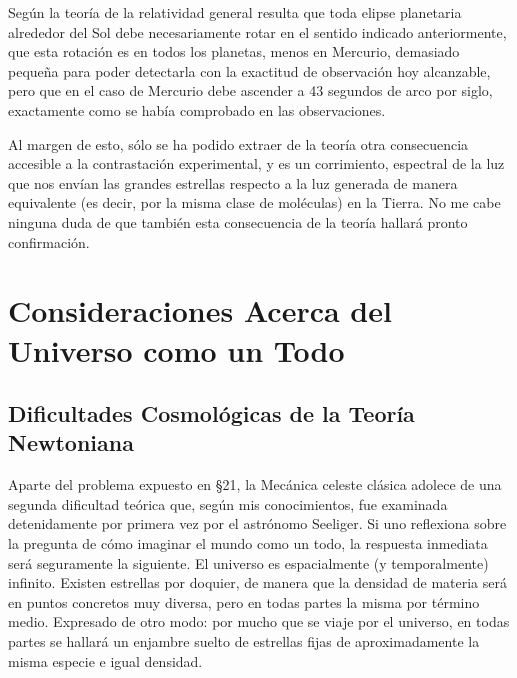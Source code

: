 \documentclass[spanish]{book}
\begin{document}
Según la teoría de la relatividad general resulta que toda elipse planetaria alrededor
del Sol debe necesariamente rotar en el sentido indicado anteriormente, que esta
rotación es en todos los planetas, menos en Mercurio, demasiado pequeña para poder
detectarla con la exactitud de observación hoy alcanzable, pero que en el caso de
Mercurio debe ascender a 43 segundos de arco por siglo, exactamente como se había
comprobado en las observaciones.

Al margen de esto, sólo se ha podido extraer de la teoría otra consecuencia
accesible a la contrastación experimental, y es un corrimiento, espectral de la luz que
nos envían las grandes estrellas respecto a la luz generada de manera equivalente (es
decir, por la misma clase de moléculas) en la Tierra. No me cabe ninguna duda de que
también esta consecuencia de la teoría hallará pronto confirmación.



\part{Consideraciones Acerca del Universo como un Todo}


\chapter{Dificultades Cosmológicas de la Teoría Newtoniana}

Aparte del problema expuesto en \S 21, la Mecánica celeste clásica adolece de una
segunda dificultad teórica que, según mis conocimientos, fue examinada detenidamente
por primera vez por el astrónomo Seeliger. Si uno reflexiona sobre la pregunta
de cómo imaginar el mundo como un todo, la respuesta inmediata será seguramente la
siguiente. El universo es espacialmente (y temporalmente) infinito. Existen estrellas
por doquier, de manera que la densidad de materia será en puntos concretos muy
diversa, pero en todas partes la misma por término medio. Expresado de otro modo:
por mucho que se viaje por el universo, en todas partes se hallará un enjambre suelto
de estrellas fijas de aproximadamente la misma especie e igual densidad.
\end{document}
